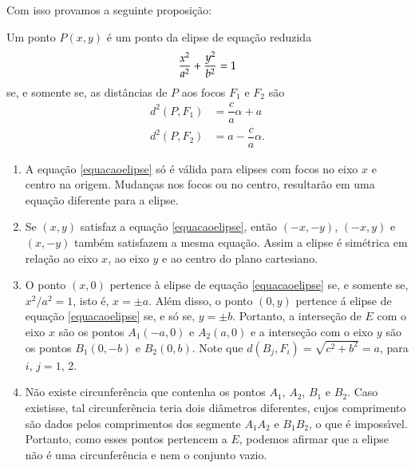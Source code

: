 Com isso provamos a seguinte proposi\c{c}\~ao:
\begin{proposicao}
  Um ponto $P(x,y)$ \'e um ponto da elipse de equa\c{c}\~ao reduzida
  \[
    \dfrac{x^2}{a^2} + \dfrac{y^2}{b^2} = 1
  \]
  se, e somente se, as dist\^ancias de $P$ aos focos $F_1$ e $F_2$ s\~ao
  \begin{align*}
    d^2(P,F_1) &= \dfrac{c}{a}\alpha + a\\
    d^2(P,F_2) &= a - \dfrac{c}{a}\alpha.
  \end{align*}
\end{proposicao}

\begin{observacao}
  \begin{enumerate}
    \item A equa\c{c}\~ao \eqref{equacaoelipse} s\'o \'e v\'alida para elipses com focos no eixo $x$ e centro na origem. Mudan\c{c}as nos focos ou no centro, resultar\~ao em uma equa\c{c}\~ao diferente para a elipse.
    \item Se $(x,y)$ satisfaz a equa\c{c}\~ao \eqref{equacaoelipse}, ent\~ao $(-x,-y)$, $(-x,y)$ e $(x,-y)$ tamb\'em satisfazem a mesma equa\c{c}\~ao. Assim a elipse \'e sim\'etrica em rela\c{c}\~ao ao eixo $x$, ao eixo $y$ e ao centro do plano cartesiano.
    \item O ponto $(x,0)$ pertence \`a elipse de equa\c{c}\~ao \eqref{equacaoelipse} se, e somente se, $x^2/a^2 = 1$, isto \'e, $x = \pm a$. Al\'em disso, o ponto $(0,y)$ pertence \'a elipse de equa\c{c}\~ao \eqref{equacaoelipse} se, e s\'o se, $y = \pm b$. Portanto, a interse\c{c}\~ao de $E$ com o eixo $x$ s\~ao os pontos $A_1(-a,0)$ e $A_2(a,0)$ e a interse\c{c}\~ao com o eixo $y$ s\~ao os pontos $B_1(0,-b)$ e $B_2(0,b)$. Note que $d(B_j,F_i) = \sqrt{c^2 + b^2} = a$, para $i$, $j = 1$, 2.
    \item N\~ao existe circunfer\^encia que contenha os pontos $A_1$, $A_2$, $B_1$ e $B_2$. Caso existisse, tal circunfer\^encia teria dois di\^ametros diferentes, cujos comprimento s\~ao dados pelos comprimentos dos segmente $A_1A_2$ e $B_1B_2$, o que \'e imposs{\'\i}vel. Portanto, como esses pontos pertencem a $E$, podemos afirmar que a elipse n\~ao \'e uma circunfer\^encia e nem o conjunto vazio.
  \end{enumerate}
\end{observacao}

